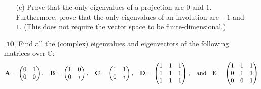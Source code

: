 \documentclass[12pt]{article}
\begin{document}
\begin{itemize}
\begin{itemize}
    \vspace{.3cm}
    \item[(c)]
    Prove that the only eigenvalues of a projection are $0$ and $1$. Furthermore, prove that the only eigenvalues of an involution are $-1$ and $1$. (This does not require the vector space to be finite-dimensional.)
    
    \end{itemize}
    
    
    \item[$\textbf{[10]}$]
    Find all the (complex) eigenvalues and eigenvectors of the following matrices over $\mathbb{C}$:
    \begin{equation*}
    \mathbf{A} = \begin{pmatrix}
    0 & 1 \\
    0 & 0
    \end{pmatrix}, \hspace{.3cm} \mathbf{B} = \begin{pmatrix}
    1 & 0 \\
    0 & i
    \end{pmatrix}, \hspace{.3cm} \mathbf{C} = \begin{pmatrix}
    1 & 1 \\
    0 & i
    \end{pmatrix}, \hspace{.3cm} \mathbf{D} = \begin{pmatrix}
    1 & 1 & 1 \\
    1 & 1 & 1 \\
    1 & 1 & 1
    \end{pmatrix}, \hspace{.3cm} \text{and} \hspace{.3cm} \mathbf{E} = \begin{pmatrix}
    1 & 1 & 1 \\
    0 & 1 & 1 \\
    0 & 0 & 1
    \end{pmatrix}
    \end{equation*}
    
    \end{itemize}
\end{document}
